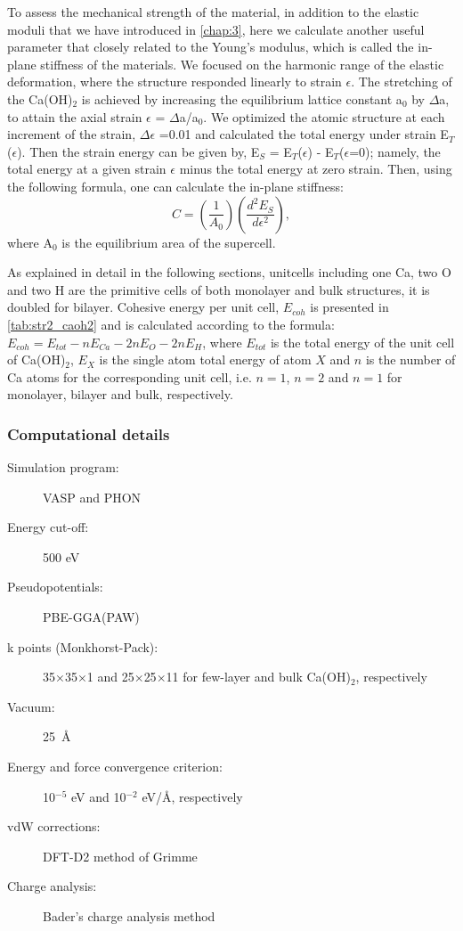 To assess the mechanical strength of the material, in addition to the elastic moduli that we have introduced in \autoref{chap:3}, here we calculate another useful parameter that closely related to the Young's modulus, which is called the in-plane stiffness of the materials. We 
focused on the harmonic range of the elastic deformation, where the structure 
responded linearly to strain $\epsilon$. The stretching of the Ca(OH)$_{2}$ is 
achieved by increasing the equilibrium lattice constant a$_{0}$ by $\Delta$a, 
to attain the axial strain $\epsilon$ = $\Delta$a/a$_{0}$. We optimized the 
atomic structure at each increment of the strain, $\Delta\epsilon$ =0.01 and 
calculated the total energy under strain E$_{T}$($\epsilon$). Then the strain 
energy can be given by, E$_{S}$ = E$_{T}$($\epsilon$) - E$_{T}$($\epsilon$=0); 
namely, the total energy at a given strain $\epsilon$ minus the total energy at 
zero strain. Then, using the following formula, one can calculate the in-plane 
stiffness: 
\begin{equation}
 C = (\dfrac{1}{A_{0}})(\dfrac{d^{2}E_{S}}{d\epsilon^{2}}),
\end{equation}
where A$_{0}$ is the equilibrium area of the supercell.

As explained in detail in the following sections, unitcells including one Ca,
two O and two H are the primitive cells of both monolayer and bulk structures, 
it is doubled for bilayer. Cohesive energy per unit cell,
$E_{coh}$ is presented in \autoref{tab:str2_caoh2} and is calculated according to the formula:
$E_{coh}=E_{tot}-nE_{Ca}-2nE_O-2nE_H$, where $E_{tot}$ is the total energy
of the unit cell of Ca(OH)$_2$, $E_X$ is the single atom total energy of atom $X$
and $n$ is the number of Ca atoms for the corresponding unit cell, i.e.
$n=1$, $n=2$ and $n=1$ for monolayer, bilayer and bulk, respectively. 

\subsubsection{Computational details}

\begin{footnotesize}
\begin{description}
\item[Simulation program:] VASP and PHON\cite{alfe}
\item[Energy cut-off:] 500 eV
\item[Pseudopotentials:] PBE-GGA(PAW)
\item[k points (Monkhorst-Pack):] 35$\times$35$\times$1 and 25$\times$25$\times$11 for few-layer and bulk Ca(OH)$_{2}$, respectively 
\item[Vacuum:] 25~\AA
\item[Energy and force convergence criterion:] 10$^{-5}$ eV and 10$^{-2}$ eV/\AA, respectively
\item[vdW corrections:] DFT-D2 method of Grimme \cite{Grimme}
\item[Charge analysis:] Bader's charge analysis method\cite{Bader1,Bader2,Bader3}
\end{description}
\end{footnotesize}



